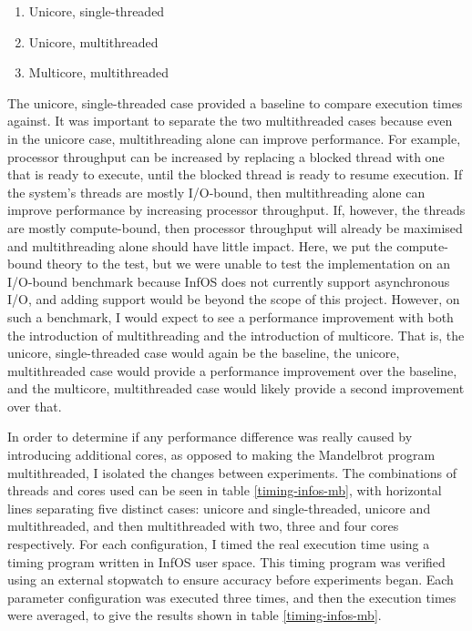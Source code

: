 \documentclass[bsc,frontabs,singlespacing,parskip,deptreport]{infthesis}
\begin{document}
\begin{enumerate}
    \item Unicore, single-threaded 
    \item Unicore, multithreaded 
    \item Multicore, multithreaded
\end{enumerate}

The unicore, single-threaded case provided a baseline to compare execution times against. It was important to separate the two multithreaded cases because even in the unicore case, multithreading alone can improve performance. For example, processor throughput can be increased by replacing a blocked thread with one that is ready to execute, until the blocked thread is ready to resume execution. If the system's threads are mostly I/O-bound, then multithreading alone can improve performance by increasing processor throughput. If, however, the threads are mostly compute-bound, then processor throughput will already be maximised and multithreading alone should have little impact. Here, we put the compute-bound theory to the test, but we were unable to test the implementation on an I/O-bound benchmark because InfOS does not currently support asynchronous I/O, and adding support would be beyond the scope of this project. However, on such a benchmark, I would expect to see a performance improvement with both the introduction of multithreading and the introduction of multicore. That is, the unicore, single-threaded case would again be the baseline, the unicore, multithreaded case would provide a performance improvement over the baseline, and the multicore, multithreaded case would likely provide a second improvement over that.

In order to determine if any performance difference was really caused by introducing additional cores, as opposed to making the Mandelbrot program multithreaded, I isolated the changes between experiments. The combinations of threads and cores used can be seen in table \ref{timing-infos-mb}, with horizontal lines separating five distinct cases: unicore and single-threaded, unicore and multithreaded, and then multithreaded with two, three and four cores respectively. For each configuration, I timed the real execution time using a timing program written in InfOS user space. This timing program was verified using an external stopwatch to ensure accuracy before experiments began. Each parameter configuration was executed three times, and then the execution times were averaged, to give the results shown in table \ref{timing-infos-mb}.
\end{document}
